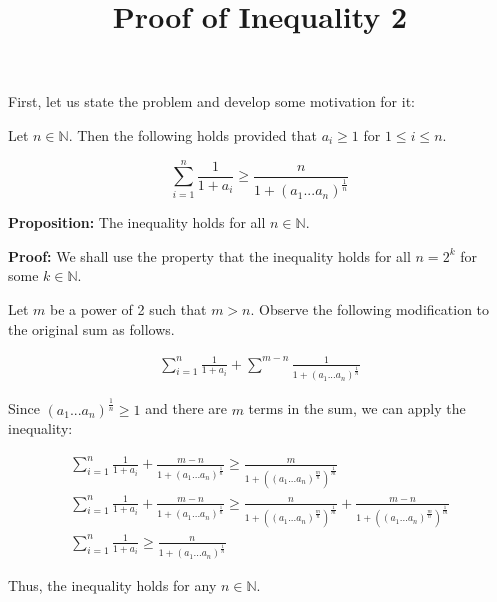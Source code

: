 \documentclass[11pt]{article}
\title{Proof of Inequality 2}
\author{\Name}
\begin{document}
\maketitle

First, let us state the problem and develop some motivation for it: \newline

Let $n \in \mathbb{N}$. Then the following holds provided that $a_i \geq 1$ for $1 \leq i \leq n$.

\begin{equation}
 \sum_{i=1}^{n} \frac{1}{1 + a_i} \geq \frac{n}{1 + (a_1...a_n)^{\frac{1}{n}}}
\end{equation}

\textbf{Proposition: } The inequality holds for all $n \in  \mathbb{N}$. \newline

\textbf{Proof: } We shall use the property that the inequality holds for all $n = 2^k$ for some $k \in \mathbb{N}$.

Let $m$ be a power of 2 such that $m > n$. Observe the following modification to the original sum as follows.

\begin{gather}
  \sum_{i=1}^{n} \frac{1}{1 + a_i} + \sum^{m-n} \frac{1}{1 + (a_1...a_n)^{\frac{1}{n}}} 
\end{gather}

Since $(a_1...a_n)^{\frac{1}{n}} \geq 1$ and there are $m$ terms in the sum, we can apply the inequality:

\begin{gather}
\sum_{i=1}^{n} \frac{1}{1 + a_i} + \frac{m-n}{1 + (a_1...a_n)^{\frac{1}{n}}} \geq \frac{m}{1 + ((a_1...a_n)^{\frac{m}{n}})^{\frac{1}{m}}} \\ 
\sum_{i=1}^{n} \frac{1}{1 + a_i} + \frac{m-n}{1 + (a_1...a_n)^{\frac{1}{n}}} \geq \frac{n}{1 + ((a_1...a_n)^{\frac{m}{n}})^{\frac{1}{m}}} + \frac{m-n}{1 + ((a_1...a_n)^{\frac{m}{n}})^{\frac{1}{m}}} \\
\sum_{i=1}^{n} \frac{1}{1 + a_i} \geq \frac{n}{1 + (a_1...a_n)^{\frac{1}{n}}}
\end{gather}

Thus, the inequality holds for any $n \in \mathbb{N}$.
\end{document}

